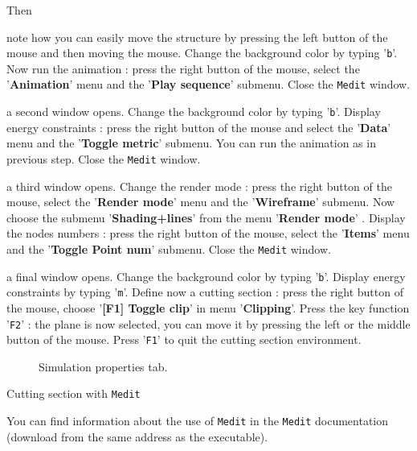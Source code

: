 Then 

\begin{Eitem}
\item note how you can easily move the structure by pressing the left button of the mouse and then moving the mouse. Change the background color by typing '{\tt b}'. Now run the animation : press the right button of the mouse, select the '{\bf Animation}' menu and the '{\bf Play sequence}' submenu. Close the {\tt Medit} window.
\item a second window opens. Change the background color by typing '{\tt b}'. Display energy constraints : press the right button of the mouse and select the '{\bf Data}' menu and the '{\bf Toggle metric}' submenu. You can run the animation as in  previous step. Close the {\tt Medit} window.
\item a third window opens. Change the render mode : press the right button of the mouse, select the '{\bf Render mode}' menu and the '{\bf Wireframe}' submenu. Now choose the submenu '{\bf Shading+lines}' from the menu '{\bf Render mode}' . Display the nodes numbers : press the right button of the mouse, select the '{\bf Items}' menu and the '{\bf Toggle Point num}' submenu. Close the {\tt Medit} window.
\item a final window opens. Change the background color by typing '{\tt b}'. Display energy constraints by typing '{\tt m}'. Define now a cutting section : press the right button of the mouse, choose '{\bf [F1] Toggle clip}' in menu '{\bf Clipping}'. Press the key function '{\tt F2}' : the plane is now selected, you can move it by pressing the left or the middle button of the mouse. Press '{\tt F1}' to quit the cutting section environment.
\end{Eitem}

\begin{center}
\begin{figure}[H]
\centering
{} %
 \caption{Simulation properties tab.}
  \label{fig:feplot_fe_simul}
\end{figure}

Cutting section with {\tt Medit}
\end{center}
You can find information about the use of {\tt Medit} in the {\tt Medit} documentation (download from the same address as the executable). 

